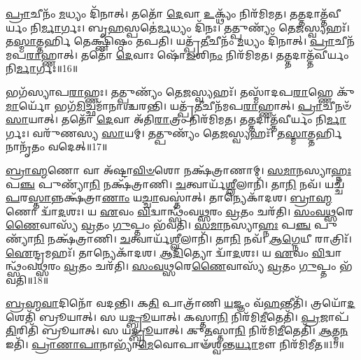 \-\ul{𑌪𑍍𑌰𑌾}\-𑌚𑍀𑌨𑌂᳴ \ul{𑌮}\-𑌧𑍍𑌯𑌂 𑌦𑌿᳴𑌨𑌾𑌤𑍍।
𑌤𑌤𑍋᳴ \ul{𑌦𑍇}\-𑌵𑌾 \ul{𑌉}\-𑌕𑍍𑌥𑍍𑌯𑌂᳴ 𑌨𑌿𑌰᳴𑌮𑌿𑌮𑌤।
𑌤𑌤𑍍𑌤𑌦𑌾𑌤𑍍𑌤᳴𑌵𑍀𑌰𑍍𑌯𑌂 𑌨𑌿\-\ul{𑌰𑍍𑌮𑌾}\-𑌰𑍍𑌗𑌃।
𑌬𑍃\-\ul{𑌹}\-𑌸𑍍𑌪𑌤𑍇॑\-\ul{𑌰𑍍𑌮}\-𑌧𑍍𑌯𑌂 𑌦𑌿᳴𑌨𑌃।
𑌤𑌤𑍍𑌪𑍁𑌣𑍍𑌯𑌂᳴ 𑌤𑍇\-\ul{𑌜}\-𑌸𑍍𑌵𑍍𑌯𑌹𑌃᳴।
𑌤\-\ul{𑌸𑍍𑌮𑌾}\-𑌤𑍍𑌤𑌰𑍍\mbox{}\-\ul{𑌹𑌿} 𑌤𑍇𑌕𑍍𑌷𑍍𑌣𑌿᳴𑌷𑍍𑌠𑌂 𑌤𑌪𑌤𑌿।
𑌯𑌤𑍍𑌪𑍍𑌰᳴\-\ul{𑌤𑍀}\-𑌚𑍀𑌨𑌂᳴ \ul{𑌮}\-𑌧𑍍𑌯𑌂 𑌦𑌿᳴𑌨𑌾𑌤𑍍।
\-\ul{𑌪𑍍𑌰𑌾}\-𑌚𑍀𑌨᳴𑌮𑌪\-\ul{𑌰𑌾}\-𑌹𑍍𑌣𑌾𑌤𑍍।
𑌤𑌤𑍋᳴ \ul{𑌦𑍇}\-𑌵𑌾𑌃 𑌷𑍋᳴\-\ul{𑌡}\-𑌶𑌿\-\ul{𑌨𑌂} 𑌨𑌿𑌰᳴𑌮𑌿𑌮𑌤।
𑌤𑌤𑍍𑌤𑌦𑌾𑌤𑍍𑌤᳴𑌵𑍀𑌰𑍍𑌯𑌂 𑌨𑌿\-\ul{𑌰𑍍𑌮𑌾}\-𑌰𑍍𑌗𑌃॥16॥

𑌭𑌗᳴𑌸𑍍𑌯𑌾𑌪\-\ul{𑌰𑌾}\-𑌹𑍍𑌣𑌃।
𑌤𑌤𑍍𑌪𑍁𑌣𑍍𑌯𑌂᳴ 𑌤𑍇\-\ul{𑌜}\-𑌸𑍍𑌵𑍍𑌯𑌹𑌃᳴।
𑌤𑌸𑍍𑌮𑌾᳴𑌦𑌪\-\ul{𑌰𑌾}\-𑌹𑍍𑌣𑍇 𑌕𑍁᳴\-\ul{𑌮𑌾}\-𑌰𑍍𑌯𑍋᳴ 𑌭𑌗᳴\-\ul{𑌮𑌿}\-𑌚𑍍𑌛𑌮𑌾᳴𑌨𑌾𑌶𑍍𑌚𑌰𑌨𑍍𑌤𑌿।
𑌯𑌤𑍍𑌪𑍍𑌰᳴\-\ul{𑌤𑍀}\-𑌚𑍀𑌨᳴𑌮𑌪\-\ul{𑌰𑌾}\-𑌹𑍍𑌣𑌾𑌤𑍍।
\-\ul{𑌪𑍍𑌰𑌾}\-𑌚𑍀𑌨𑍞᳴ \ul{𑌸𑌾}\-𑌯𑌾𑌤𑍍।
𑌤𑌤𑍋᳴ \ul{𑌦𑍇}\-𑌵𑌾 𑌅᳴𑌤𑌿\-\ul{𑌰𑌾}\-𑌤𑍍𑌰𑌂 𑌨𑌿𑌰᳴𑌮𑌿𑌮𑌤।
𑌤𑌤𑍍𑌤𑌦𑌾𑌤𑍍𑌤᳴𑌵𑍀𑌰𑍍𑌯𑌂 𑌨𑌿\-\ul{𑌰𑍍𑌮𑌾}\-𑌰𑍍𑌗𑌃।
𑌵𑌰𑍁᳴𑌣𑌸𑍍𑌯 \ul{𑌸𑌾}\-𑌯𑌮𑍍।
𑌤𑌤𑍍𑌪𑍁𑌣𑍍𑌯𑌂᳴ 𑌤𑍇\-\ul{𑌜}\-𑌸𑍍𑌵𑍍𑌯𑌹𑌃᳴।
𑌤\-\ul{𑌸𑍍𑌮𑌾}\-𑌤𑍍𑌤𑌰𑍍\mbox{}\-\ul{𑌹𑌿} 𑌨𑌾𑌨𑍃᳴𑌤𑌂 𑌵𑌦𑍇𑌤𑍍॥17॥

\-\ul{𑌬𑍍𑌰𑌾}\-\-\ul{𑌹𑍍𑌮}\-𑌣𑍋 𑌵𑌾 𑌅᳴𑌷𑍍𑌟𑌾\-\ul{𑌵𑌿}\-\-\ul{𑍞}\-𑌶𑍋 𑌨𑌕𑍍𑌷᳴𑌤𑍍𑌰𑌾𑌣𑌾𑌮𑍍।
\-\ul{𑌸}\-\-\ul{𑌮𑌾}\-𑌨𑌸𑍍𑌯𑌾\-\ul{𑌹𑍍𑌨𑌃} 𑌪\-\ul{𑌞𑍍𑌚} 𑌪𑍁𑌣𑍍𑌯𑌾᳴\-\ul{𑌨𑌿} 𑌨𑌕𑍍𑌷᳴𑌤𑍍𑌰𑌾𑌣𑌿।
\-\ul{𑌚}\-𑌤𑍍𑌵𑌾𑌰𑍍𑌯᳴\-\ul{𑌶𑍍𑌲𑍀}\-𑌲𑌾𑌨𑌿᳴।
𑌤𑌾\-\ul{𑌨𑌿} 𑌨𑌵᳴।
𑌯𑌚𑍍𑌚᳴ \ul{𑌪}\-𑌰\-\ul{𑌸𑍍𑌤𑌾}\-𑌨𑍍𑌨𑌕𑍍𑌷᳴𑌤𑍍𑌰𑌾\-\ul{𑌣𑌾𑌂} 𑌯\-\ul{𑌚𑍍𑌚𑌾}\-𑌵𑌸𑍍𑌤𑌾॑𑌤𑍍।
𑌤𑌾𑌨𑍍𑌯𑍇𑌕𑌾᳴𑌦𑌶।
\-\ul{𑌬𑍍𑌰𑌾}\-\-\ul{𑌹𑍍𑌮}\-𑌣𑍋 𑌦𑍍𑌵𑌾᳴\-\ul{𑌦}\-𑌶𑌃।
𑌯 \ul{𑌏}\-𑌵𑌂 \ul{𑌵𑌿}\-𑌦𑍍𑌵𑌾𑌨𑍍𑌥𑍍𑌸𑌂᳴𑌵\-\ul{𑌥𑍍𑌸}\-𑌰𑌂 \ul{𑌵𑍍𑌰}\-𑌤𑌂 𑌚𑌰᳴𑌤𑌿।
\-\ul{𑌸𑌂}\-\-\ul{𑌵}\-\-\ul{𑌥𑍍𑌸}\-𑌰𑍇\-\ul{𑌣𑍈}\-𑌵𑌾𑌸𑍍𑌯᳴ \ul{𑌵𑍍𑌰}\-𑌤𑌂 \ul{𑌗𑍁}\-𑌪𑍍𑌤𑌂 𑌭᳴𑌵𑌤𑌿।
\-\ul{𑌸}\-\-\ul{𑌮𑌾}\-𑌨𑌸𑍍𑌯𑌾\-\ul{𑌹𑍍𑌨𑌃} 𑌪\-\ul{𑌞𑍍𑌚} 𑌪𑍁𑌣𑍍𑌯𑌾᳴\-\ul{𑌨𑌿} 𑌨𑌕𑍍𑌷᳴𑌤𑍍𑌰𑌾𑌣𑌿।
\-\ul{𑌚}\-𑌤𑍍𑌵𑌾𑌰𑍍𑌯᳴\-\ul{𑌶𑍍𑌲𑍀}\-𑌲𑌾𑌨𑌿᳴।
𑌤𑌾\-\ul{𑌨𑌿} 𑌨𑌵᳴।
\-\ul{𑌆}\-\-\ul{𑌗𑍍𑌨𑍇}\-𑌯𑍀 𑌰𑌾𑌤𑍍𑌰𑌿𑌃᳴।
\-\ul{𑌐}\-𑌨𑍍𑌦𑍍𑌰𑌮𑌹𑌃᳴।
𑌤𑌾𑌨𑍍𑌯𑍇𑌕𑌾᳴𑌦𑌶।
\-\ul{𑌆}\-\-\ul{𑌦𑌿}\-𑌤𑍍𑌯𑍋 𑌦𑍍𑌵𑌾᳴\-\ul{𑌦}\-𑌶𑌃।
𑌯 \ul{𑌏}\-𑌵𑌂 \ul{𑌵𑌿}\-𑌦𑍍𑌵𑌾𑌨𑍍𑌥𑍍𑌸𑌂᳴𑌵\-\ul{𑌥𑍍𑌸}\-𑌰𑌂 \ul{𑌵𑍍𑌰}\-𑌤𑌂 𑌚𑌰᳴𑌤𑌿।
\-\ul{𑌸𑌂}\-\-\ul{𑌵}\-\-\ul{𑌥𑍍𑌸}\-𑌰𑍇\-\ul{𑌣𑍈}\-𑌵𑌾𑌸𑍍𑌯᳴ \ul{𑌵𑍍𑌰}\-𑌤𑌂 \ul{𑌗𑍁}\-𑌪𑍍𑌤𑌂 𑌭᳴𑌵𑌤𑌿॥18॥\anuvakamend[\-\ul{𑌸}\-\-\ul{𑌙𑍍𑌗}\-𑌵𑌾𑌥𑍍𑌷𑍋᳴\-\ul{𑌡}\-𑌶𑌿\-\ul{𑌨𑌂} 𑌨𑌿𑌰᳴𑌮𑌿𑌮\-\ul{𑌤} 𑌤𑌤𑍍𑌤𑌦𑌾𑌤𑍍𑌤᳴𑌵𑍀𑌰𑍍𑌯𑌂 𑌨𑌿\-\ul{𑌰𑍍𑌮𑌾}\-𑌰𑍍𑌗𑍋 𑌵᳴𑌦𑍇𑌦𑍍𑌭𑌵𑌤𑌿 𑌸\-\ul{𑌮𑌾}\-𑌨𑌸𑍍𑌯𑌾\-\ul{𑌹𑍍𑌨𑌃} 𑌪\-\ul{𑌞𑍍𑌚} 𑌪𑍁𑌣𑍍𑌯𑌾᳴\-\ul{𑌨𑌿} 𑌨𑌕𑍍𑌷᳴𑌤𑍍𑌰𑌾\-\ul{𑌣𑍍𑌯}\-𑌷𑍍𑌟𑍗 𑌚᳴]

\-\ul{𑌬𑍍𑌰}\-\-\ul{𑌹𑍍𑌮}\-\-\ul{𑌵𑌾}\-𑌦𑌿𑌨𑍋᳴ 𑌵𑌦𑌨𑍍𑌤𑌿।
𑌕\-\ul{𑌤𑌿} 𑌪𑌾𑌤𑍍𑌰𑌾᳴𑌣𑌿 \ul{𑌯}\-𑌜𑍍𑌞𑌂 𑌵᳴\-\ul{𑌹}\-𑌨𑍍𑌤𑍀𑌤𑌿᳴।
𑌤𑍍𑌰𑌯𑍋᳴\-\ul{𑌦}\-𑌶𑍇𑌤𑌿᳴ 𑌬𑍍𑌰𑍂𑌯𑌾𑌤𑍍।
𑌸 𑌯\-\ul{𑌦𑍍𑌬𑍍𑌰𑍂}\-𑌯𑌾𑌤𑍍।
𑌕𑌸𑍍𑌤𑌾\-\ul{𑌨𑌿} 𑌨𑌿𑌰᳴𑌮𑌿\-\ul{𑌮𑍀}\-𑌤𑍇𑌤𑌿᳴।
\-\ul{𑌪𑍍𑌰}\-𑌜𑌾𑌪᳴\-\ul{𑌤𑌿}\-𑌰𑌿𑌤𑌿᳴ 𑌬𑍍𑌰𑍂𑌯𑌾𑌤𑍍।
𑌸 𑌯\-\ul{𑌦𑍍𑌬𑍍𑌰𑍂}\-𑌯𑌾𑌤𑍍।
𑌕𑍁\-\ul{𑌤}\-𑌸𑍍𑌤𑌾\-\ul{𑌨𑌿} 𑌨𑌿𑌰᳴𑌮𑌿\-\ul{𑌮𑍀}\-𑌤𑍇𑌤𑌿᳴।
\-\ul{𑌆}\-𑌤𑍍𑌮\-\ul{𑌨} 𑌇𑌤𑌿᳴।
\-\ul{𑌪𑍍𑌰𑌾}\-\-\ul{𑌣𑌾}\-\-\ul{𑌪𑌾}\-𑌨𑌾𑌭𑍍𑌯𑌾᳴\-\ul{𑌮𑍇}\-𑌵𑍋𑌪𑌾𑍟᳴\-𑌶𑍍𑌵𑌨𑍍𑌤\-\ul{𑌰𑍍𑌯𑌾}\-𑌮𑍗 𑌨𑌿𑌰᳴𑌮𑌿𑌮𑍀𑌤॥19॥

